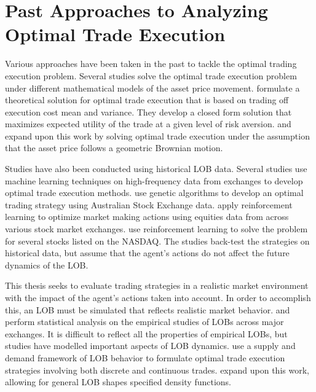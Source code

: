 \section{Past Approaches to Analyzing Optimal Trade Execution}
Various approaches have been taken in the past to tackle the optimal trading execution problem. Several studies solve the optimal trade execution problem under different mathematical models of the asset price movement. \cite{A1} formulate a theoretical solution for optimal trade execution that is based on trading off execution cost mean and variance. They develop a closed form solution that maximizes expected utility of the trade at a given level of risk aversion. \cite{A1a} and \cite{A1b} expand upon this work by solving optimal trade execution under the assumption that the asset price follows a geometric Brownian motion. 

Studies have also been conducted using historical LOB data. Several studies use machine learning techniques on high-frequency data from exchanges to develop optimal trade execution methods. \cite{A5} use genetic algorithms to develop an optimal trading strategy using Australian Stock Exchange data. \cite{A4} apply reinforcement learning to optimize market making actions using equities data from across various stock market exchanges. \cite{A3} use reinforcement learning to solve the problem for several stocks listed on the NASDAQ. The studies back-test the strategies on historical data, but assume that the agent's actions do not affect the future dynamics of the LOB.

This thesis seeks to evaluate trading strategies in a realistic market environment with the impact of the agent’s actions taken into account. In order to accomplish this, an LOB must be simulated that reflects realistic market behavior. \cite{A10a} and \cite{A10b} perform statistical analysis on the empirical studies of LOBs across major exchanges. It is difficult to reflect all the properties of empirical LOBs, but studies have modelled important aspects of LOB dynamics. \cite{A11} use a supply and demand framework of LOB behavior to formulate optimal trade execution strategies involving both discrete and continuous trades. \cite{A2} expand upon this work, allowing for general LOB shapes specified density functions.

